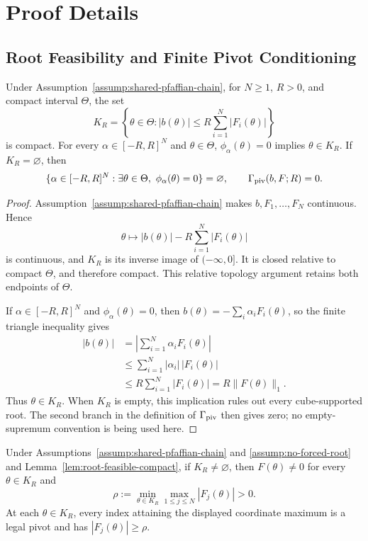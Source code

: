 \appendix

\section{Proof Details}
\setlength{\emergencystretch}{3em}

\subsection{Root Feasibility and Finite Pivot Conditioning}

\begin{lemma}
\label{lem:root-feasible-compact}
Under Assumption~\ref{assump:shared-pfaffian-chain}, for $N\geq1$, $R>0$,
and compact interval $\Theta$, the set
\[
K_R=\left\{\theta\in\Theta:
 |b(\theta)|\leq R\sum_{i=1}^N|F_i(\theta)|\right\}
\]
is compact.  For every $\alpha\in[-R,R]^N$ and $\theta\in\Theta$,
$\phi_\alpha(\theta)=0$ implies $\theta\in K_R$.  If $K_R=\varnothing$,
then
\[
\{\alpha\in[-R,R]^N:\exists\theta\in\Theta,
 \ \phi_\alpha(\theta)=0\}=\varnothing,
\qquad
\Gamma_{\rm piv}(b,F;R)=0.
\]
\end{lemma}

\begin{proof}
Assumption~\ref{assump:shared-pfaffian-chain} makes $b,F_1,\ldots,F_N$
continuous.  Hence
\[
\theta\longmapsto |b(\theta)|-R\sum_{i=1}^N|F_i(\theta)|
\]
is continuous, and $K_R$ is its inverse image of $(-\infty,0]$.  It is
closed relative to compact $\Theta$, and therefore compact.  This relative
topology argument retains both endpoints of $\Theta$.

If $\alpha\in[-R,R]^N$ and $\phi_\alpha(\theta)=0$, then
$b(\theta)=-\sum_i\alpha_iF_i(\theta)$, so the finite triangle inequality
gives
\[
\begin{aligned}
|b(\theta)|
&=\left|\sum_{i=1}^N\alpha_iF_i(\theta)\right|\\
&\leq\sum_{i=1}^N|\alpha_i|\,|F_i(\theta)|\\
&\leq R\sum_{i=1}^N|F_i(\theta)|
=R\|F(\theta)\|_1.
\end{aligned}
\]
Thus $\theta\in K_R$.  When $K_R$ is empty, this implication rules out
every cube-supported root.  The second branch in the definition of
$\Gamma_{\rm piv}$ then gives zero; no empty-supremum convention is being
used here.
\end{proof}

\begin{lemma}
\label{lem:positive-pivot-margin}
Under Assumptions~\ref{assump:shared-pfaffian-chain} and
\ref{assump:no-forced-root} and Lemma~\ref{lem:root-feasible-compact}, if
$K_R\neq\varnothing$, then $F(\theta)\neq0$ for every $\theta\in K_R$ and
\[
\rho:=\min_{\theta\in K_R}\max_{1\leq j\leq N}|F_j(\theta)|>0.
\]
At each $\theta\in K_R$, every index attaining the displayed coordinate
maximum is a legal pivot and has $|F_j(\theta)|\geq\rho$.
\end{lemma}

